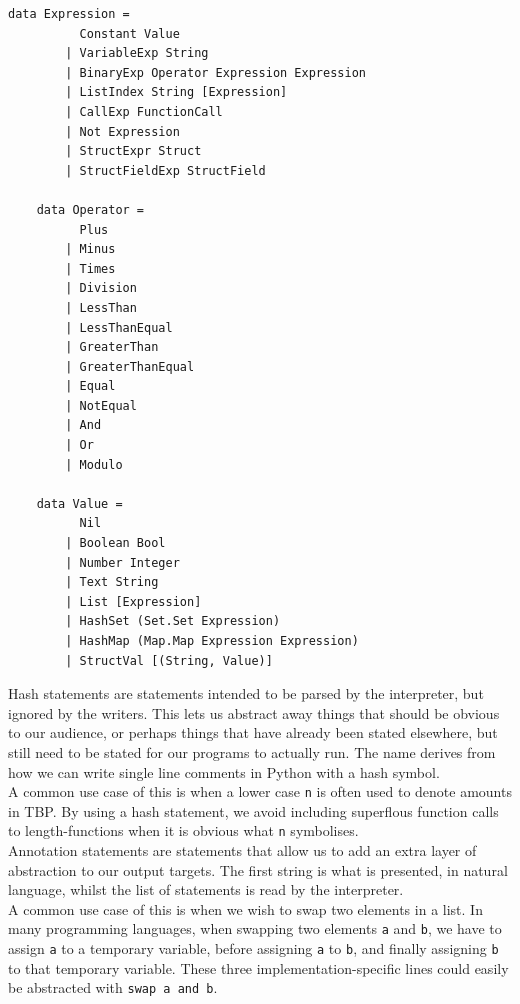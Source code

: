 \begin{lstlisting}[caption={Psnodig's data types in Haskell}, captionpos=b, frame=trbl]
    data Expression =
          Constant Value
        | VariableExp String
        | BinaryExp Operator Expression Expression
        | ListIndex String [Expression]
        | CallExp FunctionCall
        | Not Expression
        | StructExpr Struct
        | StructFieldExp StructField

    data Operator =
          Plus
        | Minus
        | Times
        | Division
        | LessThan
        | LessThanEqual
        | GreaterThan
        | GreaterThanEqual
        | Equal
        | NotEqual
        | And
        | Or
        | Modulo

    data Value =
          Nil
        | Boolean Bool
        | Number Integer
        | Text String
        | List [Expression]
        | HashSet (Set.Set Expression)
        | HashMap (Map.Map Expression Expression)
        | StructVal [(String, Value)]
\end{lstlisting}

Hash statements are statements intended to be parsed by the interpreter, but ignored by the writers. This lets us abstract away things that should be obvious to our audience, or perhaps things that have already been stated elsewhere, but still need to be stated for our programs to actually run. The name derives from how we can write single line comments in Python with a hash symbol. \hfill \\

A common use case of this is when a lower case \texttt{n} is often used to denote amounts in TBP. By using a hash statement, we avoid including superflous function calls to length-functions when it is obvious what \texttt{n} symbolises. \hfill \\

Annotation statements are statements that allow us to add an extra layer of abstraction to our output targets. The first string is what is presented, in natural language, whilst the list of statements is read by the interpreter. \hfill \\

A common use case of this is when we wish to swap two elements in a list. In many programming languages, when swapping two elements \texttt{a} and \texttt{b}, we have to assign \texttt{a} to a temporary variable, before assigning \texttt{a} to \texttt{b}, and finally assigning \texttt{b} to that temporary variable. These three implementation-specific lines could easily be abstracted with \texttt{swap a and b}. \hfill \\

